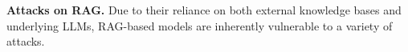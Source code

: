 \vspace{2pt}
{\bf Attacks on RAG.}
Due to their reliance on both external knowledge bases and underlying LLMs, RAG-based models are inherently vulnerable to a variety of attacks. 

